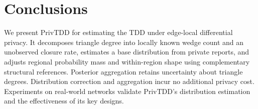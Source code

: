 \section{Conclusions}
We present PrivTDD for estimating the TDD under edge-local differential privacy.
It decomposes triangle degree into locally known wedge count and an unobserved closure rate, estimates a base distribution from private reports, and adjusts regional probability mass and within-region shape using complementary structural references.
Posterior aggregation retains uncertainty about triangle degrees. Distribution correction and aggregation incur no additional privacy cost.
Experiments on real-world networks validate PrivTDD's distribution estimation and the effectiveness of its key designs.
